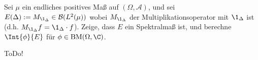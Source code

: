 \begin{exercise}[34/2]

Sei $\mu$ ein endliches positives Maß auf $(\Omega, \mathcal{A})$, und sei $E(\Delta) := M_{\1_\Delta} \in \mathcal{B}(L^2(\mu))$ wobei $M_{\1_\Delta}$ der Multiplikationsoperator mit $\1_\Delta$ ist (d.h. $M_{\1_\Delta} f = \1_\Delta \cdot f$).
Zeige, dass $E$ ein Spektralmaß ist, und berechne $\Int{\phi}{E}$ für $\phi \in \mathrm{BM}(\Omega, \C)$.

\end{exercise}

\begin{solution}

ToDo!

\end{solution}
